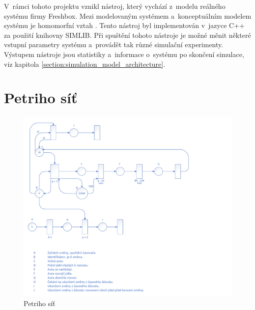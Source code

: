 \documentclass[a4paper, 11pt]{article}
\begin{document}
	V~rámci tohoto projektu vznikl nástroj, který vychází z~modelu reálného
	systému firmy Freshbox. Mezi modelovaným systémem a~konceptuálním
	modelem systému je homomorfní vztah \cite[snímek 28]{IMS_slides}. Tento
	nástroj byl implementován v~jazyce C++ za použití knihovny SIMLIB.
	Při spuštění tohoto nástroje je možné měnit některé vstupní parametry
	systému a~provádět tak různé simulační experimenty. Výstupem nástroje
	jsou statistiky a~informace o~systému po skončení simulace, viz kapitola
	\ref{section:simulation_model_architecture}.



	\clearpage
	
	\renewcommand{\refname}{Literatura}
	



	\clearpage
	\appendix


	\section{Petriho síť}
	\label{appendix:petri_net}

	\begin{figure}[ht]
		\centering
		\includegraphics[width=1 \linewidth]{inc/petri_net.pdf}

		\caption{Petriho síť}
	\end{figure}
\end{document}
